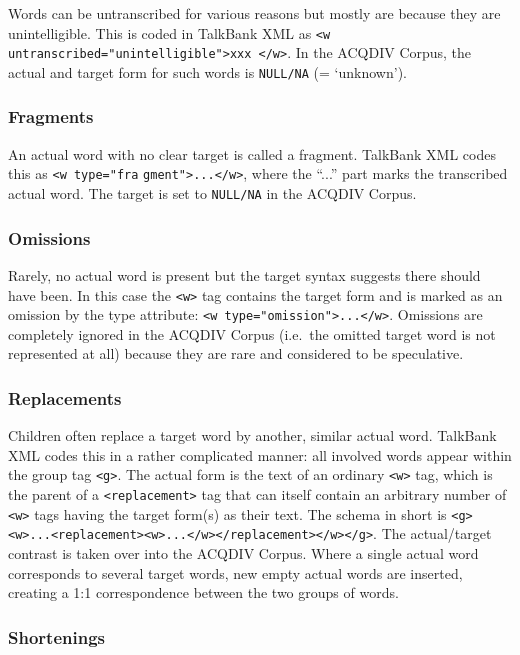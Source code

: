 \documentclass[a4paper, 11pt]{book}
\begin{document}
Words can be untranscribed for various reasons but mostly are because they are unintelligible. This is coded in TalkBank XML as \texttt{<w untranscribed="unintelligible">xxx </w>}. In the ACQDIV Corpus, the actual and target form for such words is \texttt{NULL/NA} (= ‘unknown’).

\subsubsection*{Fragments}

An actual word with no clear target is called a fragment. TalkBank XML codes this as \texttt{<w type="fra} \texttt{gment">...</w>}, where the “...” part marks the transcribed actual word. The target is set to \texttt{NULL/NA} in the ACQDIV Corpus.

\subsubsection*{Omissions}

Rarely, no actual word is present but the target syntax suggests there should have been. In this case the \texttt{<w>} tag contains the target form and is marked as an omission by the type attribute: \texttt{<w type="omission">...</w>}. Omissions are completely ignored in the ACQDIV Corpus (i.e.\ the omitted target word is not represented at all) because they are rare and considered to be speculative.

\subsubsection*{Replacements}

Children often replace a target word by another, similar actual word. TalkBank XML codes this in a rather complicated manner: all involved words appear within the group tag \texttt{<g>}. The actual form is the text of an ordinary \texttt{<w>} tag, which is the parent of a \texttt{<replacement>} tag that can itself contain an arbitrary number of \texttt{<w>} tags having the target form(s) as their text. The schema in short is \texttt{<g><w>...<replacement><w>...</w></replacement></w></g>}. The actual/target contrast is taken over into the ACQDIV Corpus. Where a single actual word corresponds to several target words, new empty actual words are inserted, creating a 1:1 correspondence between the two groups of words.

\subsubsection*{Shortenings}
\end{document}
